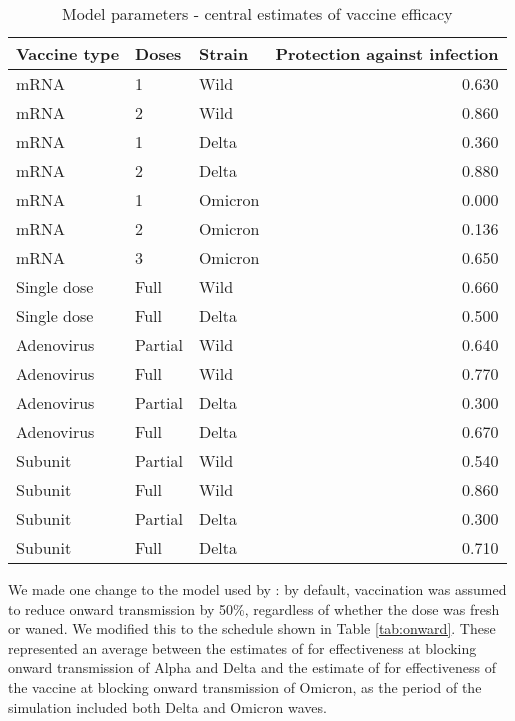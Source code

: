 \documentclass{article}
\begin{document}
\begin{table}

\caption{\label{tab:vaccine-efficacy}Model parameters - central estimates of vaccine efficacy}
\centering
\begin{tabular}[t]{lllr}
\toprule
Vaccine type & Doses & Strain & Protection against infection\\
\midrule
mRNA & 1 & Wild & 0.630\\
mRNA & 2 & Wild & 0.860\\
mRNA & 1 & Delta & 0.360\\
mRNA & 2 & Delta & 0.880\\
mRNA & 1 & Omicron & 0.000\\
mRNA & 2 & Omicron & 0.136\\
mRNA & 3 & Omicron & 0.650\\
Single dose & Full & Wild & 0.660\\
Single dose & Full & Delta & 0.500\\
Adenovirus & Partial & Wild & 0.640\\
Adenovirus & Full & Wild & 0.770\\
Adenovirus & Partial & Delta & 0.300\\
Adenovirus & Full & Delta & 0.670\\
Subunit & Partial & Wild & 0.540\\
Subunit & Full & Wild & 0.860\\
Subunit & Partial & Delta & 0.300\\
Subunit & Full & Delta & 0.710\\
\bottomrule
\end{tabular}
\end{table}

We made one change to the model used by \citep{watsonoliverj.COVID19LMICReports2022}: by default, vaccination was assumed to reduce onward transmission by 50\%, regardless of whether the dose was fresh or waned. We modified this to the schedule shown in Table \ref{tab:onward}. These represented an average between the estimates of \citep{eyreImpactSARSCoV2Vaccination2021a} for effectiveness at blocking onward transmission of Alpha and Delta and the estimate of \citep{tanInfectiousnessSARSCoV2Breakthrough2023} for effectiveness of the vaccine at blocking onward transmission of Omicron, as the period of the simulation included both Delta and Omicron waves.
\end{document}
